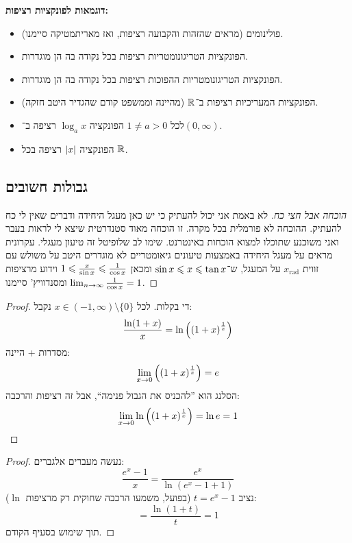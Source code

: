 \documentclass[name=רשימות חשבון דיפרנציאלי ואינטגרלי 1א]{../../../tex/classes/megasumPreamble}
\begin{document}
	
	\textbf{דוגמאות לפונקציות רציפות: }
	\begin{itemize}
		\item פולינומים (מראים שהזהות והקבועה רציפות, ואז מאריתמטיקה סיימנו).
		\item הפונקציות הטריגונומטריות רציפות בכל נקודה בה הן מוגדרות.
		\item הפונקציות הטריגונומטריות ההפוכות רציפות בכל נקודה בה הן מוגדרות.
		\item הפונקציות המעריכיות רציפות ב־$\mathbb{R}$ (מהיינה וממשפט קודם שהגדיר היטב חזקה).
		\item לכל $1 \neq a > 0$ הפונקציה $\log_a x$ רציפה ב־$(0, \infty)$.
		\item הפונקציה $\left \lvert x \right \rvert$ רציפה בכל $\mathbb{R}$.
	\end{itemize}
	
	\subsection{גבולות חשובים}
	\begin{proof}[הוכחה אבל חצי כח]
		לא באמת אני יכול להעתיק כי יש כאן מעגל היחידה ודברים שאין לי כח להעתיק. ההוכחה לא פורמלית בכל מקרה. זו הוכחה מאוד סטנדרטית שיצא לי לראות בעבר ואני משוכנע שתוכלו למצוא הוכחות באינטרנט. שימו לב שלופיטל זה טיעון מעגלי. עקרונית מראים על מעגל היחידה באמצעות טיעונים גיאומטריים לא מוגדרים היטב על משולש עם זווית $x_{\mathrm{rad}}$ על המעגל, ש־$\sin x \leqslant x \leqslant \tan x$ ומכאן $1 \leqslant \frac{x}{\sin x} \leqslant \frac{1}{\cos x}$ וידוע מרציפות $\lim_{n \to \infty} \frac{1}{\cos x} = 1$ ומסנדוויץ' סיימנו.
	\end{proof}
	
	\begin{proof}
		די בקלות. לכל $x \in (-1, \infty) \setminus \{0\}$ נקבל:
		\[ \frac{\ln(1 + x)}{x} = \ln\left ( \left ( 1 + x \right )^\frac{1}{x} \right ) \]
		מסדרות + היינה:
		\[ \lim_{x \to 0} \left ( (1 + x)^{\frac{1}{x}} \right ) = e \]
		הסלנג הוא ''להכניס את הגבול פנימה``, אבל זה רציפות והרכבה:
		\[ \lim_{x \to 0} \ln\left ( (1 + x)^{\frac{1}{x}} \right ) = \ln e = 1 \]
	\end{proof}
	\begin{proof}
		נעשה מעברים אלגברים:
		\[ \frac{e^{x} - 1}{x} = \frac{e^{x}}{\ln(e^{x} - 1 + 1)} \]
		נציב $t = e^{x} - 1$ (בפועל, משמעו הרכבה שחוקית רק מרציפות $\ln$):
		\[ = \frac{\ln(1 + t)}{t} = 1 \]
		תוך שימוש בסעיף הקודם.
	\end{proof}
	
\end{document}

